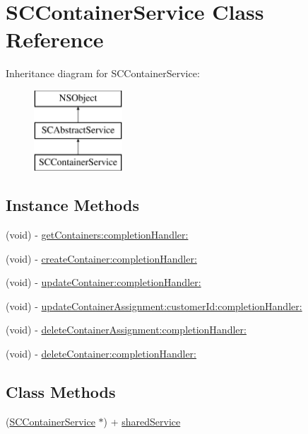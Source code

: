 \hypertarget{interface_s_c_container_service}{}\section{S\+C\+Container\+Service Class Reference}
\label{interface_s_c_container_service}
Inheritance diagram for S\+C\+Container\+Service\+:\begin{figure}[H]
\begin{center}
\leavevmode
\includegraphics[height=3.000000cm]{interface_s_c_container_service}
\end{center}
\end{figure}
\subsection*{Instance Methods}
\begin{DoxyCompactItemize}
\item 
(void) -\/ \hyperlink{interface_s_c_container_service_a24261444351ce211c41e52b33f3e3b50}{get\+Containers\+:completion\+Handler\+:}
\item 
(void) -\/ \hyperlink{interface_s_c_container_service_aaa0b55442e9576cd149f9f6e0cffb344}{create\+Container\+:completion\+Handler\+:}
\item 
(void) -\/ \hyperlink{interface_s_c_container_service_a4ec339fac7bb30d6f362850c9109729b}{update\+Container\+:completion\+Handler\+:}
\item 
(void) -\/ \hyperlink{interface_s_c_container_service_ac9e937b496c75c61d27ee9b38cddc745}{update\+Container\+Assignment\+:customer\+Id\+:completion\+Handler\+:}
\item 
(void) -\/ \hyperlink{interface_s_c_container_service_a12d0c67e6d668680979ae8f513eaf2e0}{delete\+Container\+Assignment\+:completion\+Handler\+:}
\item 
(void) -\/ \hyperlink{interface_s_c_container_service_afed26a1a3305d28b49442f6c701c7942}{delete\+Container\+:completion\+Handler\+:}
\end{DoxyCompactItemize}
\subsection*{Class Methods}
\begin{DoxyCompactItemize}
\item 
(\hyperlink{interface_s_c_container_service}{S\+C\+Container\+Service} $\ast$) + \hyperlink{interface_s_c_container_service_a9b5b8986b9241c08684c309ad94c0f55}{shared\+Service}
\end{DoxyCompactItemize}
